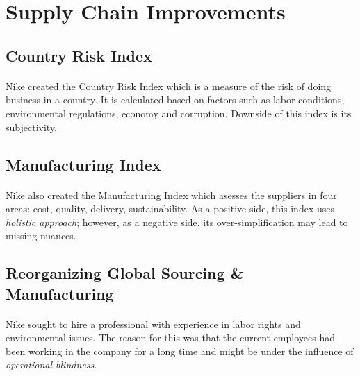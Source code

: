\section{Supply Chain Improvements}

\subsection{Country Risk Index}

\paragraph{} Nike created the Country Risk Index which is a measure of the risk of doing business in a country. It is calculated based on factors such as labor conditions, environmental regulations, economy and corruption. Downside of this index is its subjectivity.

\subsection{Manufacturing Index}

\paragraph{} Nike also created the Manufacturing Index which asesses the suppliers in four areas: cost, quality, delivery, sustainability. As a positive side, this index uses \textit{holistic approach}; however, as a negative side, its over-simplification may lead to missing nuances. 

\subsection{Reorganizing Global Sourcing \& Manufacturing}

\paragraph{} Nike sought to hire a professional with experience in labor rights and environmental issues. The reason for this was that the current employees had been working in the company for a long time and might be under the influence of \textit{operational blindness}.